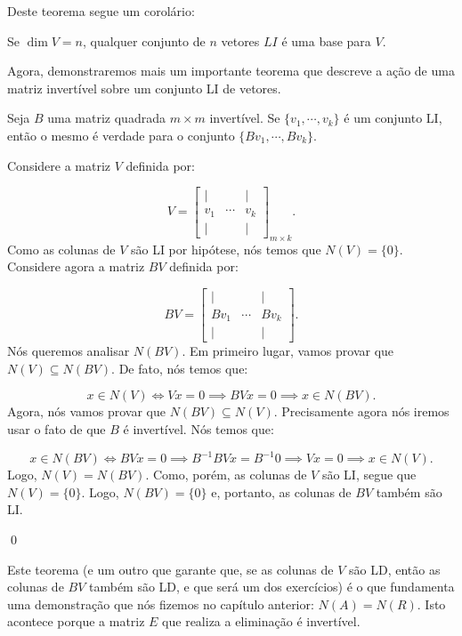 Deste teorema segue um corolário:

\begin{Corolary}
	Se $\dim V = n$, qualquer conjunto de $n$ vetores $LI$ é uma base para $V$.
\end{Corolary}

Agora, demonstraremos mais um importante teorema que descreve a ação de uma matriz invertível sobre um conjunto LI de vetores.

\begin{Theorem}
	Seja $B$ uma matriz quadrada $m\times m$ invertível. Se $\{v_1, \cdots, v_k\}$ é um conjunto LI, então o mesmo é verdade para o conjunto $\{Bv_1, \cdots, Bv_k\}$.
\end{Theorem}

\begin{Proof}
	Considere a matriz $V$ definida por:
	
	$$
	V = \begin{bmatrix}
		| & & | \\
		v_1 & \cdots & v_k \\
		| & & |
	\end{bmatrix}_{m\times k}.
	$$
	Como as colunas de $V$ são LI por hipótese, nós temos que $N(V) = \{0\}$. Considere agora a matriz $BV$ definida por:
	
	$$
	BV = \begin{bmatrix}
		| & & | \\
		Bv_1 & \cdots & Bv_k \\
		| & & |
	\end{bmatrix}.
	$$
	Nós queremos analisar $N(BV)$. Em primeiro lugar, vamos provar que $N(V)\subseteq N(BV)$. De fato, nós temos que:
	
	$$
	x\in N(V)\iff Vx = 0\implies BVx = 0\implies x\in N(BV).
	$$
	Agora, nós vamos provar que $N(BV)\subseteq N(V)$. Precisamente agora nós iremos usar o fato de que $B$ é invertível. Nós temos que:
	
	$$
	x\in N(BV)\iff BVx = 0\implies B^{-1}BVx = B^{-1}0\implies Vx = 0\implies x\in N(V).
	$$
	Logo, $N(V) = N(BV)$. Como, porém, as colunas de $V$ são LI, segue que $N(V) = \{0\}$. Logo, $N(BV) = \{0\}$ e, portanto, as colunas de $BV$ também são LI.
	
	\qed
\end{Proof}

Este teorema (e um outro que garante que, se as colunas de $V$ são LD, então as colunas de $BV$ também são LD, e que será um dos exercícios) é o que fundamenta uma demonstração que nós fizemos no capítulo anterior: $N(A) = N(R)$. Isto acontece porque a matriz $E$ que realiza a eliminação é invertível.

